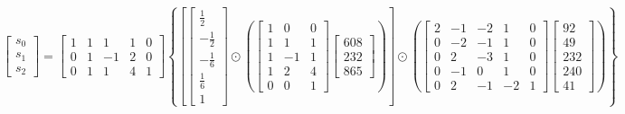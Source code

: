 \documentclass{article}%
\begin{document}
\[%
\left[\begin{matrix}s_{0}\\s_{1}\\s_{2}\end{matrix}\right] = \left[\begin{matrix}1 & 1 & 1 & 1 & 0\\0 & 1 & -1 & 2 & 0\\0 & 1 & 1 & 4 & 1\end{matrix}\right] \left\{ \left[ \left[\begin{matrix}\frac{1}{2}\\- \frac{1}{2}\\- \frac{1}{6}\\\frac{1}{6}\\1\end{matrix}\right] \odot \left( \left[\begin{matrix}1 & 0 & 0\\1 & 1 & 1\\1 & -1 & 1\\1 & 2 & 4\\0 & 0 & 1\end{matrix}\right] \left[\begin{matrix}608\\232\\865\end{matrix}\right] \right) \right] \odot \left( \left[\begin{matrix}2 & -1 & -2 & 1 & 0\\0 & -2 & -1 & 1 & 0\\0 & 2 & -3 & 1 & 0\\0 & -1 & 0 & 1 & 0\\0 & 2 & -1 & -2 & 1\end{matrix}\right] \left[\begin{matrix}92\\49\\232\\240\\41\end{matrix}\right] \right) \right\}%
\]%
\end{document}
